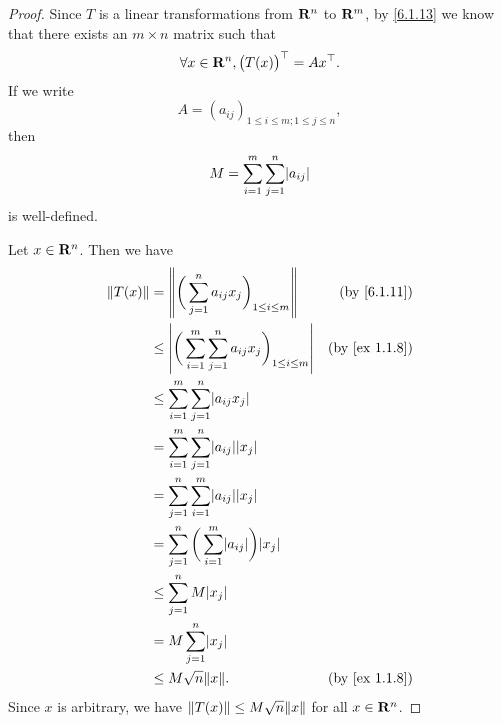 \begin{proof}
  Since \(T\) is a linear transformations from \(\mathbf{R}^n\) to \(\mathbf{R}^m\), by \cref{6.1.13} we know that there exists an \(m \times n\) matrix such that
  \[
    \forall x \in \mathbf{R}^n, \big(T(x)\big)^\top = Ax^\top.
  \]
  If we write
  \[
    A = (a_{ij})_{1 \leq i \leq m ; 1 \leq j \leq n},
  \]
  then
  \[
    M = \sum_{i = 1}^m \sum_{j = 1}^n \abs{a_{ij}}
  \]
  is well-defined.

  Let \(x \in \mathbf{R}^n\).
  Then we have
  \begin{align*}
    \norm*{T(x)} & = \norm*{\bigg(\sum_{j = 1}^n a_{ij} x_j\bigg)_{1 \leq i \leq m}}                 & \text{(by \cref{6.1.11})}   \\
                 & \leq \abs{\bigg(\sum_{i = 1}^m \sum_{j = 1}^n a_{ij} x_j\bigg)_{1 \leq i \leq m}} & \text{(by \cref{ex 1.1.8})} \\
                 & \leq \sum_{i = 1}^m \sum_{j = 1}^n \abs{a_{ij} x_j}                                                             \\
                 & = \sum_{i = 1}^m \sum_{j = 1}^n \abs{a_{ij}} \abs{x_j}                                                          \\
                 & = \sum_{j = 1}^n \sum_{i = 1}^m \abs{a_{ij}} \abs{x_j}                                                          \\
                 & = \sum_{j = 1}^n \bigg(\sum_{i = 1}^m \abs{a_{ij}}\bigg) \abs{x_j}                                              \\
                 & \leq \sum_{j = 1}^n M \abs{x_j}                                                                                 \\
                 & = M \sum_{j = 1}^n \abs{x_j}                                                                                    \\
                 & \leq M \sqrt{n} \norm*{x}.                                                        & \text{(by \cref{ex 1.1.8})}
  \end{align*}
  Since \(x\) is arbitrary, we have \(\norm*{T(x)} \leq M \sqrt{n} \norm*{x}\) for all \(x \in \mathbf{R}^n\).


\end{proof}
